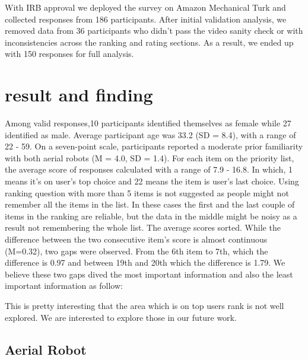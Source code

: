 \documentclass[letterpaper, 10 pt, conference]{ieeeconf}  %
\begin{document}
    With IRB approval we deployed the survey on Amazon Mechanical Turk and collected responses from 186 participants. After initial validation analysis, we removed data from 36 participants who didn't pass the video sanity check or  with inconsistencies across the ranking and rating sections. %
    As a result, we ended up with 150 responses for full analysis.

\section{result and finding}

    Among valid responses,10 participants identified themselves as female while 27 identified as male. Average participant age was 33.2 (SD = 8.4), with a range of 22 - 59. On a seven-point scale, participants reported a moderate prior familiarity with both aerial robots (M = 4.0, SD = 1.4). For each item on the priority list, the average score of responses calculated with a range of 7.9 - 16.8. In which, 1 means it's on user's top choice and 22 means the item is user's last choice. Using ranking question with more than 5 items is not suggested as people might not remember all the items in the list. In these cases the first and the last couple of items in the ranking are reliable, but the data in the middle might be noisy as a result not remembering the whole list. The average scores sorted. While the difference between the two consecutive item's score is almost continuous (M=0.32), two gaps were observed. From the 6th item to 7th, which the difference is 0.97 and between 19th and 20th which the difference is 1.79. We believe these two gaps dived the most important information and also the least important information as follow:



This is pretty interesting that the area which is on top users rank is not well explored. We are interested to explore those in our future work.

\subsection{Aerial Robot}
\end{document}
